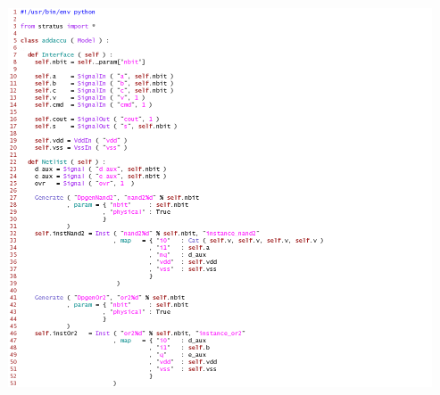 \begin{figure}[h!]
\centering
{}
          {\includegraphics[width=1.4\textwidth]{./images/addaccu1.png}}
\end{figure}

